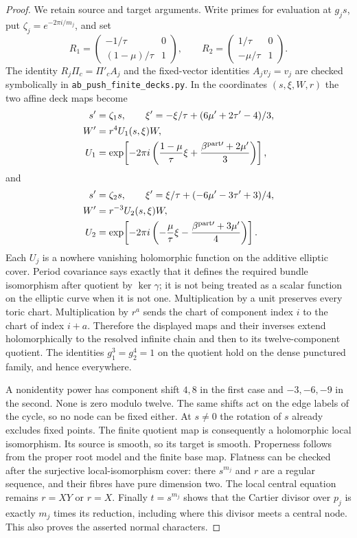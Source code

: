\begin{proof}
We retain source and target arguments. Write primes for
evaluation at $g_js$, put $\zeta_j=e^{-2\pi i/m_j}$,
and set
\[
 R_1=\begin{pmatrix}-1/\tau&0\\(1-\mu)/\tau&1\end{pmatrix},
 \qquad
 R_2=\begin{pmatrix}1/\tau&0\\-\mu/\tau&1\end{pmatrix}.
\]
The identity $R_j\Pi_c=\Pi'_c A_j$ and the fixed-vector
identities $A_jv_j=v_j$ are checked symbolically in
\texttt{ab\_push\_finite\_decks.py}. In the coordinates
$(s,\xi,W,r)$ the two affine deck maps become
\begin{align*}
 s'&=\zeta_1s,\qquad
 \xi'=-\xi/\tau+(6\mu'+2\tau'-4)/3,\\
 W'&=r^4 U_1(s,\xi)W,\\
 U_1&=\exp\!\left[-2\pi i
  \left(\frac{1-\mu}{\tau}\xi+
        \frac{\beta^{{\rm part}\prime}+2\mu'}3\right)\right],
 \end{align*}
and
\begin{align*}
 s'&=\zeta_2s,\qquad
 \xi'=\xi/\tau+(-6\mu'-3\tau'+3)/4,\\
 W'&=r^{-3} U_2(s,\xi)W,\\
 U_2&=\exp\!\left[-2\pi i
  \left(-\frac{\mu}{\tau}\xi-
        \frac{\beta^{{\rm part}\prime}+3\mu'}4\right)\right].
 \end{align*}
Each $U_j$ is a nowhere vanishing holomorphic function on
the additive elliptic cover. Period covariance says
exactly that it defines the required bundle isomorphism
after quotient by $\ker\gamma$; it is not being treated
as a scalar function on the elliptic curve when it is not
one. Multiplication by a unit preserves every toric chart.
Multiplication by $r^a$ sends the chart of component index
$i$ to the chart of index $i+a$. Therefore the displayed
maps and their inverses extend holomorphically to the
resolved infinite chain and then to its twelve-component
quotient. The identities $g_1^3=g_2^4=1$ on the quotient
hold on the dense punctured family, and hence everywhere.

A nonidentity power has component shift $4,8$ in the first
case and $-3,-6,-9$ in the second. None is zero modulo
twelve. The same shifts act on the edge labels of the
cycle, so no node can be fixed either. At $s\ne0$ the
rotation of $s$ already excludes fixed points. The finite
quotient map is consequently a holomorphic local
isomorphism. Its source is smooth, so its target is smooth.
Properness follows from the proper root model and the
finite base map. Flatness can be checked after the
surjective local-isomorphism cover: there $s^{m_j}$ and
$r$ are a regular sequence, and their fibres have pure
dimension two. The local central equation remains
$r=XY$ or $r=X$. Finally $t=s^{m_j}$ shows that the
Cartier divisor over $p_j$ is exactly $m_j$ times its
reduction, including where this divisor meets a central
node. This also proves the asserted normal characters.


\end{proof}
